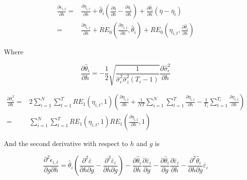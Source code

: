 \documentclass[12pt]{article}
\begin{document}
\begin{align}
\frac{\partial \epsilon_{i,t}}{\partial h} 
= {} & \frac{\partial \eta_{i,t}}{\partial h} 
+ \widehat{\theta}_{i} \left( \frac{\partial \overline{\eta}}{\partial h} 
- \frac{\partial \overline{\eta}_{i}}{\partial h} \right) 
+ \frac{\partial \widehat{\theta}_{i}}{\partial h} 
\left( \overline{\eta} - \overline{\eta}_{i} \right) \nonumber \\
= {} & \frac{\partial \eta_{i,t}}{\partial h} 
+ RE_{0} \left( \frac{\partial \eta_{i,t}}{\partial h}, \widehat{\theta}_{i} \right) 
+ RE_{0} \left( \eta_{i,t}, \frac{\partial \widehat{\theta}_{i}}{\partial h} \right)
\label{eq:re12}
\end{align}


Where

\begin{equation}
\frac{\partial{\widehat{\theta}}_{i}}{\partial h} = - \frac{1}{2}\sqrt{\frac{1}{{\widehat{\sigma}}_{\epsilon}^{2}{\widehat{\sigma}}_{z}^{2}\left( T_{i} - 1 \right)}}\frac{\partial{\widehat{\sigma}}_{\epsilon}^{2}}{\partial h}
\label{eq:re13}
\end{equation}

\begin{align}
\frac{\partial \widehat{\sigma}_{\epsilon}^{2}}{\partial h} 
= {} & 2 \sum_{i = 1}^{N} \sum_{t = 1}^{T} 
RE_{1}\left( \eta_{i,t}, 1 \right) \left( 
\frac{\partial \eta_{i,t}}{\partial h} 
+ \frac{1}{NT} \sum_{i=1}^{N} \sum_{t = 1}^{T} \frac{\partial \eta_{i,t}}{\partial h} 
- \frac{1}{T_{i}} \sum_{t = 1}^{T_{i}} \frac{\partial \eta_{i,t}}{\partial h} 
\right) \nonumber \\
= {} & \sum_{i = 1}^{N} \sum_{t = 1}^{T} 
RE_{1}\left( \eta_{i,t}, 1 \right) 
RE_{1}\left( \frac{\partial \eta_{i,t}}{\partial h}, 1 \right)
\label{eq:re14}
\end{align}

And the second derivative with respect to $h$ and $g$ is

\begin{equation}
\frac{\partial^{2}\epsilon_{i,t}}{\partial g\partial h} = {\widehat{\theta}}_{i}\left( \frac{\partial^{2}\overline{\varepsilon}}{\partial h\partial g} - \frac{\partial^{2}{\overline{\varepsilon}}_{i}}{\partial h\partial g} \right) - \frac{\partial{\widehat{\theta}}_{i}}{\partial h}\frac{\partial{\overline{\varepsilon}}_{i}}{\partial g} - \frac{\partial{\widehat{\theta}}_{i}}{\partial g}\frac{\partial{\overline{\varepsilon}}_{i}}{\partial h} - \frac{\partial^{2}{\widehat{\theta}}_{i}}{\partial h\partial g}{\overline{\varepsilon}}_{i}
\label{eq:re15}
\end{equation}
\end{document}
